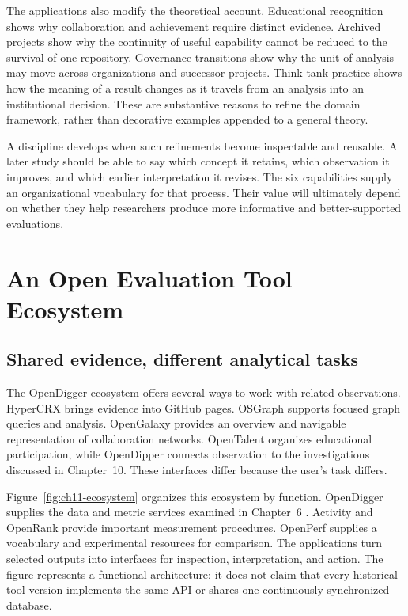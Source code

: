 

The applications also modify the theoretical account. Educational recognition shows why collaboration and achievement require distinct evidence. Archived projects show why the continuity of useful capability cannot be reduced to the survival of one repository. Governance transitions show why the unit of analysis may move across organizations and successor projects. Think-tank practice shows how the meaning of a result changes as it travels from an analysis into an institutional decision. These are substantive reasons to refine the domain framework, rather than decorative examples appended to a general theory.

A discipline develops when such refinements become inspectable and reusable. A later study should be able to say which concept it retains, which observation it improves, and which earlier interpretation it revises. The six capabilities supply an organizational vocabulary for that process. Their value will ultimately depend on whether they help researchers produce more informative and better-supported evaluations.

\FloatBarrier
\section{An Open Evaluation Tool Ecosystem}
\label{sec:ch11-ecosystem}

\subsection{Shared evidence, different analytical tasks}
The OpenDigger ecosystem offers several ways to work with related observations. HyperCRX brings evidence into GitHub pages. OSGraph supports focused graph queries and analysis. OpenGalaxy provides an overview and navigable representation of collaboration networks. OpenTalent organizes educational participation, while OpenDipper connects observation to the investigations discussed in Chapter~10. These interfaces differ because the user's task differs.

Figure~\ref{fig:ch11-ecosystem} organizes this ecosystem by function. OpenDigger supplies the data and metric services examined in Chapter~6 \citep{wang2026digger}. Activity and OpenRank provide important measurement procedures. OpenPerf supplies a vocabulary and experimental resources for comparison. The applications turn selected outputs into interfaces for inspection, interpretation, and action. The figure represents a functional architecture: it does not claim that every historical tool version implements the same API or shares one continuously synchronized database.

